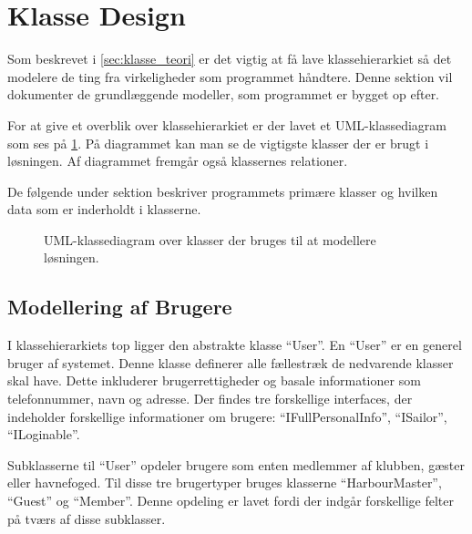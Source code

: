 \section{Klasse Design}
\label{sec:klasse_design}
Som beskrevet i \cref{sec:klasse_teori} er det vigtig at få lave klassehierarkiet så det modelere de ting fra virkeligheder som programmet håndtere. Denne sektion vil dokumenter de grundlæggende modeller, som programmet er bygget op efter. 

For at give et overblik over klassehierarkiet er der lavet et UML-klassediagram som ses på \cref{fig:UML}. På diagrammet kan man se de vigtigste klasser der er brugt i løsningen. Af diagrammet fremgår også klassernes relationer.

De følgende under sektion beskriver programmets primære klasser og hvilken data som er inderholdt i klasserne.

\begin{figure}
  \label{fig:UML}  
  \centering
  \vspace*{-4.5cm}
  \thispagestyle{empty}
 	\caption{UML-klassediagram over klasser der bruges til at modellere løsningen.}
 	\label{fig:UML}
 \end{figure}


\subsection{Modellering af Brugere}
\label{sub:brugere_af_programmet}

I klassehierarkiets top ligger den abstrakte klasse \enquote{User}. En \enquote{User} er en generel bruger af systemet. Denne klasse definerer alle fællestræk de nedvarende klasser skal have. Dette inkluderer brugerrettigheder og basale informationer som telefonnummer, navn og adresse. Der findes tre forskellige interfaces, der indeholder forskellige informationer om brugere: \enquote{IFullPersonalInfo}, \enquote{ISailor}, \enquote{ILoginable}.

Subklasserne til \enquote{User} opdeler brugere som enten medlemmer af klubben, gæster eller havnefoged. Til disse tre brugertyper bruges klasserne \enquote{HarbourMaster}, \enquote{Guest} og \enquote{Member}. Denne opdeling er lavet fordi der indgår forskellige felter på tværs af disse subklasser. 



